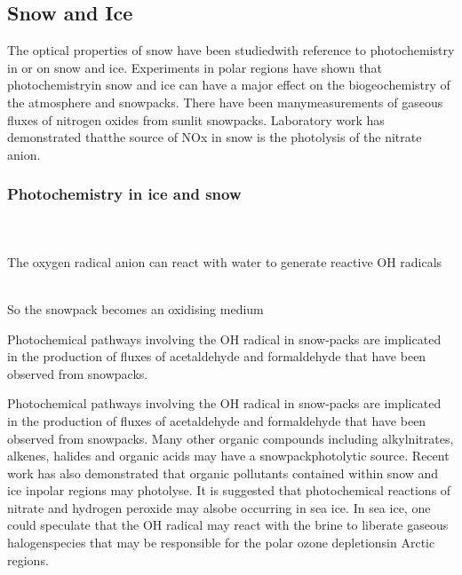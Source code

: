 \documentclass[ignorenonframetext]{beamer}
\begin{document}
\subsection{Snow and Ice}
The optical properties of snow have been studiedwith reference to photochemistry in or on snow and ice. Experiments in polar regions have shown that photochemistryin snow and ice can have a major effect on the biogeochemistry of the atmosphere and snowpacks. There have been manymeasurements of gaseous fluxes of nitrogen oxides from sunlit snowpacks. Laboratory work has demonstrated thatthe source of NOx in snow is the photolysis of the nitrate anion.
\begin{frame}
\frametitle{Photochemistry in ice and snow}
\hfill\\
\medskip {}\hfill\\
\bigskip The oxygen radical anion can react with water to generate reactive OH radicals\newline

\medskip {}\hfill\\
\medskip So the snowpack becomes an oxidising medium

Photochemical pathways involving the OH radical in snow-packs are implicated in the production of fluxes of acetaldehyde and  formaldehyde  that  have  been  observed  from  snowpacks. 
\end{frame}

Photochemical pathways involving the OH radical in snow-packs are implicated in the production of fluxes of acetaldehyde and  formaldehyde  that  have  been  observed  from  snowpacks. Many other organic compounds including alkylnitrates, alkenes, halides and organic acids may have a snowpackphotolytic source. Recent work has also demonstrated that organic pollutants contained within snow and ice inpolar regions may photolyse. It is suggested that photochemical reactions of nitrate and hydrogen peroxide may alsobe occurring in sea ice. In sea ice, one could speculate that the OH radical may react with the brine to liberate gaseous halogenspecies that may be responsible for the polar ozone depletionsin Arctic regions.
\end{document}

